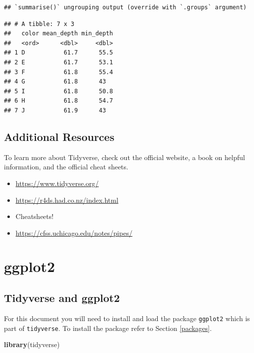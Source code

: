 \documentclass[
]{book}
\newenvironment{Shaded}{\begin{snugshade}}{\end{snugshade}}
\newcommand{\KeywordTok}[1]{\textcolor[rgb]{0.13,0.29,0.53}{\textbf{#1}}}
\newcommand{\NormalTok}[1]{#1}
\begin{document}
\begin{verbatim}
## `summarise()` ungrouping output (override with `.groups` argument)
\end{verbatim}

\begin{verbatim}
## # A tibble: 7 x 3
##   color mean_depth min_depth
##   <ord>      <dbl>     <dbl>
## 1 D           61.7      55.5
## 2 E           61.7      53.1
## 3 F           61.8      55.4
## 4 G           61.8      43  
## 5 I           61.8      50.8
## 6 H           61.8      54.7
## 7 J           61.9      43
\end{verbatim}

\hypertarget{additional-resources-6}{%
\section*{Additional Resources}\label{additional-resources-6}}

To learn more about Tidyverse, check out the official website, a book on helpful information, and the official cheat sheets.

\begin{itemize}
\item
  \url{https://www.tidyverse.org/}
\item
  \url{https://r4ds.had.co.nz/index.html}
\item
  Cheatsheets!
\item
  \url{https://cfss.uchicago.edu/notes/pipes/}
\end{itemize}

\hypertarget{ggplot2}{%
\chapter{ggplot2}\label{ggplot2}}

\hypertarget{tidyverse-and-ggplot2}{%
\section{Tidyverse and ggplot2}\label{tidyverse-and-ggplot2}}

For this document you will need to install and load the package \texttt{ggplot2} which is part of \texttt{tidyverse}. To install the package refer to Section \ref{packages}.

\begin{Shaded}
\begin{Highlighting}[]
\KeywordTok{library}\NormalTok{(tidyverse)}
\end{Highlighting}
\end{Shaded}
\end{document}
